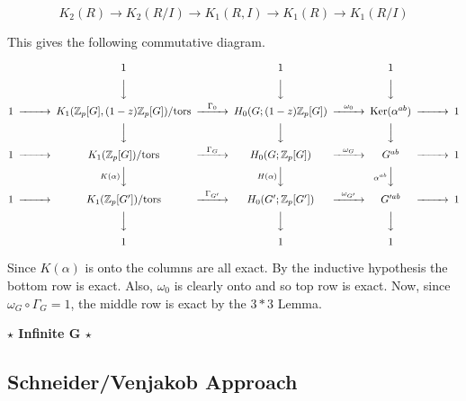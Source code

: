 $$K_2(R) \rightarrow K_2(R/I) \rightarrow K_1(R,I) \rightarrow K_1(R) \rightarrow K_1(R/I)$$

This gives the following commutative diagram.





 
$$\begin{CD}
	&&1&&1&&1&& \\
	&&@VVV @VVV  @VVV\\
1	@>>> K_1(\ZP[G],(1-z)\ZP[G])/\text{tors} @>{\Gamma_0}>>  H_0(G;(1-z)\ZP[G]) @>{\omega_0}>> \text{Ker}(\alpha^{ab}) @>>> 1\\
	&&@VVV @VVV  @VVV\\
1	@>>> K_1(\ZP[G])/\text{tors} @>{\Gamma_G}>>  H_0(G;\ZP[G]) @>{\omega_G}>> G^{ab} @>>> 1\\
	&&@V{K(\alpha)}VV @V{H(\alpha)}VV  @V{\alpha^{ab}}VV\\
1	@>>> K_1(\ZP[G'])/\text{tors} @>{\Gamma_{G'}}>>  H_0(G';\ZP[G']) @>{\omega_{G'}}>> G'^{ab} @>>> 1\\
	&&@VVV @VVV  @VVV\\
	&&1&&1&&1&& \\
\end{CD}$$

Since $K(\alpha)$ is onto the columns are all exact. By the inductive hypothesis the bottom row is exact. Also, $\omega_0$ is clearly onto and so top row is exact. Now, since $\omega_G \circ \Gamma_G = 1$, the middle row is exact by the $3*3$ Lemma.

































\textbf{$\star$ Infinite G $\star$}

\subsection{Schneider/Venjakob Approach}

